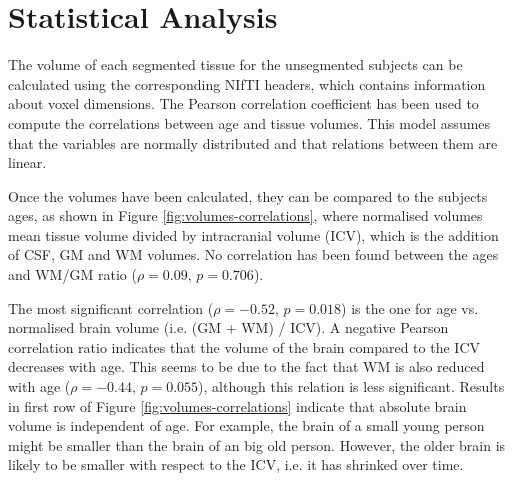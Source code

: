 \section{Statistical Analysis}



The volume of each segmented tissue for the unsegmented subjects can be calculated using the corresponding NIfTI headers, which contains information about voxel dimensions. The Pearson correlation coefficient has been used to compute the correlations between age and tissue volumes. This model assumes that the variables are normally distributed and that relations between them are linear.

Once the volumes have been calculated, they can be compared to the subjects ages, as shown in Figure \ref{fig:volumes-correlations}, where normalised volumes mean tissue volume divided by intracranial volume (ICV), which is the addition of CSF, GM and WM volumes. No correlation has been found between the ages and WM/GM ratio ($\rho = 0.09$, $p = 0.706$).

The most significant correlation ($\rho = -0.52$, $p = 0.018$) is the one for age vs. normalised brain volume (i.e. (GM + WM) / ICV). A negative Pearson correlation ratio indicates that the volume of the brain compared to the ICV decreases with age. This seems to be due to the fact that WM is also reduced with age ($\rho = -0.44$, $p = 0.055$), although this relation is less significant. Results in first row of Figure \ref{fig:volumes-correlations} indicate that absolute brain volume is independent of age. For example, the brain of a small young person might be smaller than the brain of an big old person. However, the older brain is likely to be smaller with respect to the ICV, i.e. it has shrinked over time.

